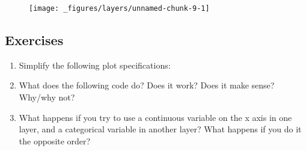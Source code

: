 \begin{figure}[H]
  \centering
  \texttt{[image: \_figures/layers/unnamed-chunk-9-1]}
\end{figure}

\subsection{Exercises}

\begin{enumerate}
\def\labelenumi{\arabic{enumi}.}
\item
  Simplify the following plot specifications:

\begin{Shaded}
\begin{Highlighting}[]
\StringTok{ }
\StringTok{  }\NormalTok{(}

\NormalTok{() +}\StringTok{ }
\StringTok{ }\NormalTok{(} \NormalTok{(}   
\StringTok{ }\NormalTok{(}  

\StringTok{ }
\StringTok{  }\NormalTok{(}\NormalTok{(} 
\end{Highlighting}
\end{Shaded}
\item
  What does the following code do? Does it work? Does it make sense?
  Why/why not?

\begin{Shaded}
\begin{Highlighting}[]
\StringTok{  }\NormalTok{(}\StringTok{ }
\StringTok{  }\NormalTok{(}
\end{Highlighting}
\end{Shaded}
\item
  What happens if you try to use a continuous variable on the x axis in
  one layer, and a categorical variable in another layer? What happens
  if you do it the opposite order?
\end{enumerate}

